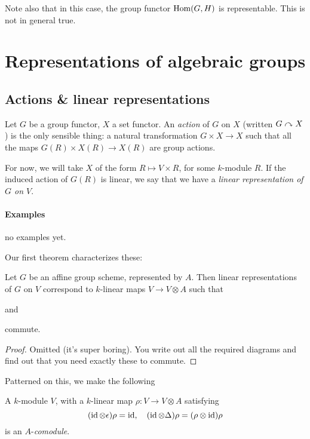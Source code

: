 \documentclass{memoir}
\begin{document}
Note also that in this case, the group functor $ \operatorname{Hom}(G,H) $ is representable. This is not in general true.

\chapter{Representations of algebraic groups}
\section{Actions \& linear representations}
Let $ G $ be a group functor, $ X $ a set functor. An \emph{action} of $ G $ on $ X $ (written $ G\curvearrowright X $) is the only sensible thing: a natural transformation $ G\times X\to X $ such that all the maps $ G(R)\times X(R)\to X(R) $ are group actions.

For now, we will take $ X $ of the form $ R\mapsto V\times R $, for some $ k $-module $ R $. If the induced action of $ G(R) $ is linear, we say that we have a \emph{linear representation of $ G $ on $ V $}.
\subsubsection{Examples}
 no examples yet.

Our first theorem characterizes these:
\begin{theorem}\label{thm:characterize_linear_reps}
Let $ G $ be an affine group scheme, represented by $ A $. Then linear representations of $ G $ on $ V $ correspond to $ k $-linear maps $ V\to V\otimes A $ such that
 and  commute.
\end{theorem}
\begin{proof}
	Omitted (it's super boring). You write out all the required diagrams and find out that you need exactly these to commute.
\end{proof}

Patterned on this, we make the following
\begin{definition}\label{def:comodule}
A $ k $-module $V$, with a $ k $-linear map $ \rho\colon V\to V\otimes A $ satisfying \[(\operatorname{id}\otimes \epsilon)\rho =\operatorname{id}, \quad (\operatorname{id}\otimes \Delta)\rho = (\rho\otimes \operatorname{id})\rho\] is an $ A $-\emph{comodule}.
\end{definition}
\end{document}
